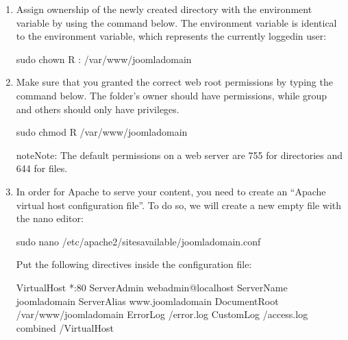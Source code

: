 \documentclass[a4paper,10pt,english,openany,oneside]{sphinxmanual}
\begin{document}
\begin{enumerate}
\item {} 
\sphinxAtStartPar
Assign ownership of the newly created directory with the  environment variable by using the command below. The  environment variable is identical to the  environment variable, which represents the currently logged\sphinxhyphen{}in user:

\begin{sphinxVerbatim}[commandchars=\\\{\}]
\PYGZdl{} sudo chown \PYGZhy{}R : /var/www/joomla\PYGZhy{}domain
\end{sphinxVerbatim}

\item {} 
\sphinxAtStartPar
Make sure that you granted the correct web root permissions by typing the command below. The folder’s owner should have  permissions, while group and others should only have  privileges.

\begin{sphinxVerbatim}[commandchars=\\\{\}]
\PYGZdl{} sudo chmod \PYGZhy{}R  /var/www/joomla\PYGZhy{}domain
\end{sphinxVerbatim}

\begin{sphinxadmonition}{note}{Note:}
\sphinxAtStartPar
The default permissions on a web server are 755 for directories and 644 for files.
\end{sphinxadmonition}

\item {} 
\sphinxAtStartPar
In order for Apache to serve your content, you need to create an “Apache virtual host configuration file”. To do so, we will create a new empty file with the nano editor:

\begin{sphinxVerbatim}[commandchars=\\\{\}]
\PYGZdl{} sudo nano /etc/apache2/sites\PYGZhy{}available/joomla\PYGZhy{}domain.conf
\end{sphinxVerbatim}

\sphinxAtStartPar
Put the following directives inside the configuration file:

\begin{sphinxVerbatim}[commandchars=\\\{\},numbers=left,firstnumber=1,stepnumber=1]
\PYGZlt{}VirtualHost *:80\PYGZgt{}
ServerAdmin webadmin@localhost
ServerName joomla\PYGZhy{}domain
ServerAlias www.joomla\PYGZhy{}domain
DocumentRoot /var/www/joomla\PYGZhy{}domain
ErrorLog /error.log
CustomLog /access.log combined
\PYGZlt{}/VirtualHost\PYGZgt{}
\end{sphinxVerbatim}


\end{enumerate}
\end{document}
